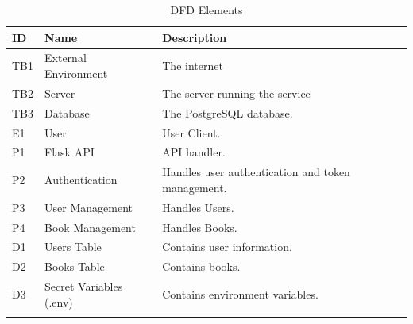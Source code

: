 \begin{longtable}{|p{1.5cm}|p{4.5cm}|p{8cm}|}
     \hline

    \hline
    \textbf{ID} &
    \textbf{Name} & 
    \textbf{Description} \\ \hline
    \endhead

    TB1 & External Environment & The internet \\ \hline
    TB2 & Server & The server running the service \\ \hline
    TB3 & Database & The PostgreSQL database. \\ \hline
    


    E1 & User & User Client. \\ \hline
    
    P1 & Flask API & API handler. \\ \hline
    P2 & Authentication & Handles user authentication and token management. \\ \hline
    P3 & User Management & Handles Users. \\ \hline
    P4 & Book Management & Handles Books. \\ \hline
    
    D1 & Users Table & Contains user information. \\ \hline
    D2 & Books Table & Contains books. \\ \hline
    D3 & Secret Variables (.env) & Contains environment variables. \\ \hline

    \caption{DFD Elements}
    \label{tab:dfdElements}

\end{longtable}









